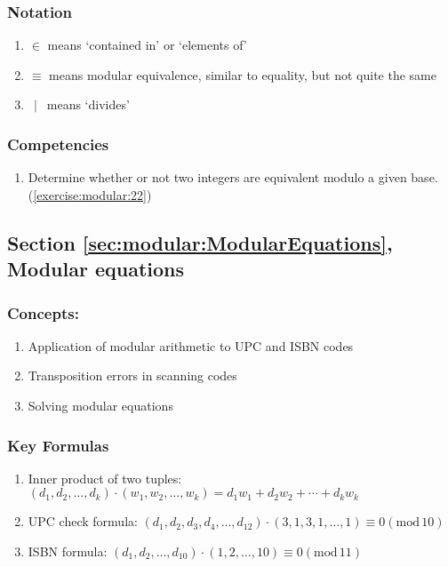 \subsubsection*{Notation}
\begin{enumerate}
\item
$\in$  means `contained in' or `elements of'
\item 
$\equiv$  means modular equivalence, similar to equality, but not quite the same
\item 
$\,\mid\,$  means `divides'
\end{enumerate}


\subsubsection*{Competencies}
\begin{enumerate}
\item
Determine whether or not two integers are equivalent modulo a given base. (\ref{exercise:modular:22}) 
\end{enumerate}


\subsection*{Section \ref{sec:modular:ModularEquations}, Modular equations}
\subsubsection*{Concepts:}
\begin{enumerate}
\item 
Application of modular arithmetic to UPC and ISBN codes
\item 
Transposition errors in scanning codes
\item
Solving modular equations
\end{enumerate}

\subsubsection*{Key Formulas}
\begin{enumerate}
\item
Inner product of two tuples: $(d_{1}, d_{2}, \dots, d_{k}) \cdot (w_{1}, w_{2}, \dots, w_{k}) = d_{1} w_{1} + d_{2}w_{2} + \cdots + d_{k}w_{k}$
\item    
UPC check formula: $(d_{1}, d_{2}, d_{3}, d_{4}, \dots, d_{12}) \cdot (3, 1, 3, 1, \dots, 1) \equiv 0 (\text{mod}\, 10)$
\item 
ISBN formula: $(d_{1}, d_{2}, \dots, d_{10}) \cdot (1, 2, \dots, 10) \equiv 0(\text{mod}\, 11)$


\end{enumerate}

